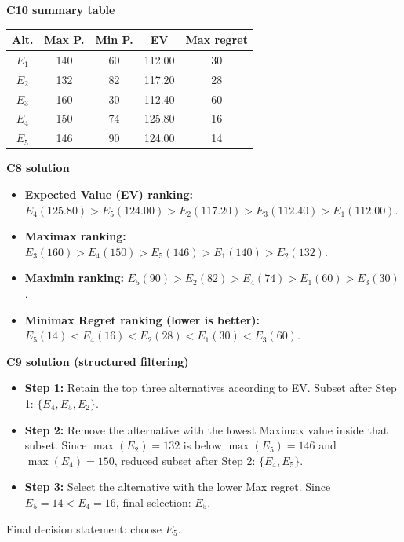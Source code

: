 \begin{ExamProblems}
		\textbf{C10 summary table}
		\begin{center}
			\begin{tabular}{c c c c c}
				\toprule
				Alt. & Max P. & Min P. & EV & Max regret \\
				\midrule
				$E_1$ & 140 & 60 & 112.00 & 30 \\
				$E_2$ & 132 & 82 & 117.20 & 28 \\
				$E_3$ & 160 & 30 & 112.40 & 60 \\
				$E_4$ & 150 & 74 & 125.80 & 16 \\
				$E_5$ & 146 & 90 & 124.00 & 14 \\
				\bottomrule
			\end{tabular}
		\end{center}

		\textbf{C8 solution}
		\begin{itemize}
			\item \textbf{Expected Value (EV) ranking:} $E_4(125.80)>E_5(124.00)>E_2(117.20)>E_3(112.40)>E_1(112.00)$.
			\item \textbf{Maximax ranking:} $E_3(160)>E_4(150)>E_5(146)>E_1(140)>E_2(132)$.
			\item \textbf{Maximin ranking:} $E_5(90)>E_2(82)>E_4(74)>E_1(60)>E_3(30)$.
			\item \textbf{Minimax Regret ranking (lower is better):} $E_5(14)<E_4(16)<E_2(28)<E_1(30)<E_3(60)$.
		\end{itemize}

		\textbf{C9 solution (structured filtering)}
		\begin{itemize}
			\item \textbf{Step 1:} Retain the top three alternatives according to EV. Subset after Step 1: $\{E_4,E_5,E_2\}$.
			\item \textbf{Step 2:} Remove the alternative with the lowest Maximax value inside that subset. Since $\max(E_2)=132$ is below $\max(E_5)=146$ and $\max(E_4)=150$, reduced subset after Step 2: $\{E_4,E_5\}$.
			\item \textbf{Step 3:} Select the alternative with the lower Max regret. Since $E_5=14<E_4=16$, final selection: $E_5$.
		\end{itemize}
		Final decision statement: choose $E_5$.

		\newpage
		\item

\end{ExamProblems}
